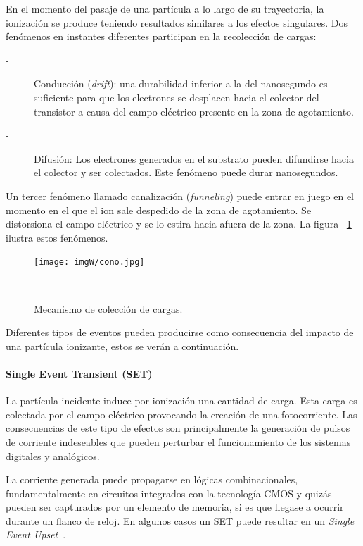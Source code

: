 \documentclass[a4paper,openright,12pt]{report}
\begin{document}
En el momento del pasaje de una partícula a lo largo de su trayectoria, la ionización se produce teniendo resultados similares a los efectos singulares. Dos fenómenos en instantes diferentes participan en la recolección de cargas:
\begin{description}
\item[-] Conducción (\textit{drift}): una durabilidad inferior a la del nanosegundo es suficiente para que los electrones se desplacen hacia el colector del transistor a causa del campo eléctrico presente en la zona de agotamiento. 
\item[-] Difusión: Los electrones generados en el substrato pueden difundirse hacia el colector y ser colectados. Este fenómeno puede durar nanosegundos.
\end{description}
Un tercer fenómeno llamado canalización (\textit{funneling}) puede entrar en juego en el momento en el que el ion sale despedido de la zona de agotamiento. Se distorsiona el campo eléctrico y se lo estira hacia afuera de la zona. La figura ~\ref{fun} ilustra estos fenómenos.

\begin{figure}[H]
	\centering
	\texttt{[image: imgW/cono.jpg]}
	\caption{Mecanismo de colección de cargas.}~\cite{CERN1} 
	\label{fun}
\end{figure}



Diferentes tipos de eventos pueden producirse como consecuencia del impacto de una partícula ionizante, estos se verán a continuación.

\paragraph{Single Event Transient (SET) } \hfill \break

La partícula incidente induce por ionización una cantidad de carga. Esta carga es colectada por el campo eléctrico provocando la creación de una fotocorriente. Las consecuencias de este tipo de efectos son principalmente la generación de pulsos de corriente indeseables que pueden perturbar el funcionamiento de los sistemas digitales y analógicos.

La corriente generada puede propagarse en lógicas combinacionales, 
 fundamentalmente en circuitos integrados con la tecnología CMOS y quizás pueden ser capturados por un elemento de memoria, si es que llegase a ocurrir durante un flanco de reloj. En algunos casos un SET puede resultar en un \textit{Single Event Upset}~\cite{ grandstrand:2004}. 
\end{document}
